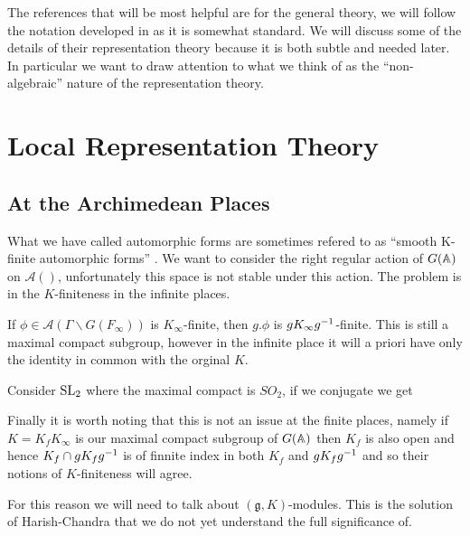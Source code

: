 The references that will be most helpful are \cite[I.II]{borelAutomorphicFormsRepresentations1979}\cite{getzIntroductionAutomorphicRepresentations2024} for the general theory, we will follow the notation developed in \cite{moeglinSpectralDecompositionEisenstein1995} as it is somewhat standard. We will discuss some of the details of their representation theory because it is both subtle and needed later. In particular we want to draw attention to what we think of as the ``non-algebraic'' nature of the representation theory.
\section{Local Representation Theory}
\subsection{At the Archimedean Places}
What we have called automorphic forms are sometimes refered to as ``smooth K-finite automorphic forms'' \cite[2.2]{cogdellLecturesLfunctionsConverse}.
We want to consider the right regular action of \(G(\A)\) on \(\mathcal{A}()\), unfortunately this space is not stable under this action. The problem is in the \(K\)-finiteness in the infinite places. 

\begin{example}
    If \(\phi\in \mathcal{A}(\Gamma \backslash G(F_\infty))\) is \(K_\infty\)-finite, then \(g.\phi\) is \(gK_\infty g^{-1}\)-finite. This is still a maximal compact subgroup, however in the infinite place it will a priori have only the identity in common with the orginal \(K\).

    Consider \(\operatorname{SL}_2\) where the maximal compact is \(SO_2\), if we conjugate we get 

    Finally it is worth noting that this is not an issue at the finite places, namely if \(K = K_fK_\infty\) is our maximal compact subgroup of \(G(\A)\) then \(K_f\) is also open and hence \(K_f \cap gK_f g^{-1}\) is of finnite index in both \(K_f\) and \(gK_f g^{-1}\) and so their notions of \(K\)-finiteness will agree. 
\end{example}

For this reason we will need to talk about \((\mathfrak{g}, K)\)-modules. This is the solution of Harish-Chandra that we do not yet understand the full significance of. 

